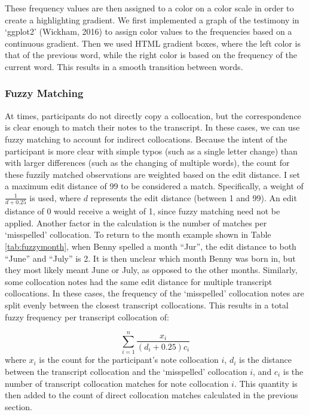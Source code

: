 \documentclass[print]{nuthesis}
\begin{document}
These frequency values are then assigned to a color on a color scale in order to create a highlighting gradient.
We first implemented a graph of the testimony in `ggplot2' (Wickham, 2016) to assign color values to the frequencies based on a continuous gradient.
Then we used HTML gradient boxes, where the left color is that of the previous word, while the right color is based on the frequency of the current word.
This results in a smooth transition between words.

\hypertarget{fuzzy-matching}{%
\subsubsection{Fuzzy Matching}\label{fuzzy-matching}}

At times, participants do not directly copy a collocation, but the correspondence is clear enough to match their notes to the transcript.
In these cases, we can use fuzzy matching to account for indirect collocations.
Because the intent of the participant is more clear with simple typos (such as a single letter change) than with larger differences (such as the changing of multiple words), the count for these fuzzily matched observations are weighted based on the edit distance.
I set a maximum edit distance of 99 to be considered a match.
Specifically, a weight of \(\frac{1}{d+0.25}\) is used, where \(d\) represents the edit distance (between 1 and 99).
An edit distance of 0 would receive a weight of 1, since fuzzy matching need not be applied.
Another factor in the calculation is the number of matches per `misspelled' collocation.
To return to the month example shown in Table \ref{tab:fuzzymonth}, when Benny spelled a month ``Jur'', the edit distance to both ``June'' and ``July'' is 2.
It is then unclear which month Benny was born in, but they most likely meant June or July, as opposed to the other months.
Similarly, some collocation notes had the same edit distance for multiple transcript collocations.
In these cases, the frequency of the `misspelled' collocation notes are split evenly between the closest transcript collocations.
This results in a total fuzzy frequency per transcript collocation of:

\[
\sum_{i=1}^n\frac{x_i}{(d_i+0.25)c_i}
\]
where \(x_i\) is the count for the participant's note collocation \(i\), \(d_i\) is the distance between the transcript collocation and the `misspelled' collocation \(i\), and \(c_i\) is the number of transcript collocation matches for note collocation \(i\).
This quantity is then added to the count of direct collocation matches calculated in the previous section.
\end{document}
